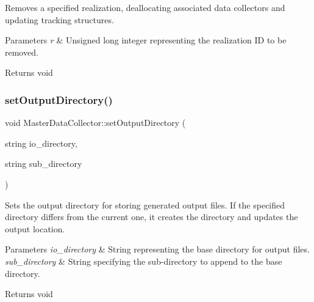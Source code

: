 Removes a specified realization, deallocating associated data collectors and updating tracking structures. 


\begin{DoxyParams}{Parameters}
{\em r} & Unsigned long integer representing the realization ID to be removed.\\
\hline
\end{DoxyParams}
\begin{DoxyReturn}{Returns}
void 
\end{DoxyReturn}
\mbox{\label{classMasterDataCollector_af597731750248576d43ffc187e48e2a8}} 
\subsubsection{\texorpdfstring{set\+Output\+Directory()}{setOutputDirectory()}}
{\footnotesize\ttfamily void Master\+Data\+Collector\+::set\+Output\+Directory (\begin{DoxyParamCaption}\item[{string}]{io\+\_\+directory,  }\item[{string}]{sub\+\_\+directory }\end{DoxyParamCaption})}



Sets the output directory for storing generated output files. If the specified directory differs from the current one, it creates the directory and updates the output location. 


\begin{DoxyParams}{Parameters}
{\em io\+\_\+directory} & String representing the base directory for output files. \\
\hline
{\em sub\+\_\+directory} & String specifying the sub-\/directory to append to the base directory.\\
\hline
\end{DoxyParams}
\begin{DoxyReturn}{Returns}
void 
\end{DoxyReturn}
\mbox{\label{classMasterDataCollector_a822c758d5e729fdd70d93b8c88b138e4}} 
